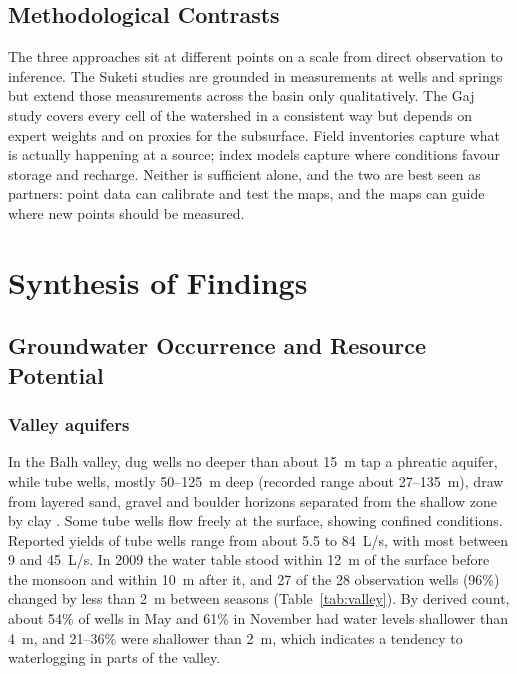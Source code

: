 \documentclass[10pt,a4paper,twocolumn]{article}
\newcommand{\lps}{L/s}
\begin{document}
\subsection{Methodological Contrasts}

The three approaches sit at different points on a scale from direct observation to inference.
The Suketi studies are grounded in measurements at wells and springs but extend those
measurements across the basin only qualitatively. The Gaj study covers every cell of the
watershed in a consistent way but depends on expert weights and on proxies for the subsurface.
Field inventories capture what is actually happening at a source; index models capture where
conditions favour storage and recharge. Neither is sufficient alone, and the two are best seen
as partners: point data can calibrate and test the maps, and the maps can guide where new
points should be measured.

\section{Synthesis of Findings}

\subsection{Groundwater Occurrence and Resource Potential}

\subsubsection{Valley aquifers}
In the Balh valley, dug wells no deeper than about 15~m tap a phreatic aquifer, while tube
wells, mostly 50--125~m deep (recorded range about 27--135~m), draw from layered sand, gravel and boulder horizons separated from
the shallow zone by clay \citep{pophare2015}. Some tube wells flow freely at the surface,
showing confined conditions. Reported yields of tube wells range from about 5.5 to 84~\lps{},
with most between 9 and 45~\lps{}. In 2009 the water table stood within 12~m of the surface
before the monsoon and within 10~m after it, and 27 of the 28 observation wells (96\%) changed by
less than 2~m between seasons (Table~\ref{tab:valley}). By derived count, about 54\% of wells in
May and 61\% in November had water levels shallower than 4~m, and 21--36\% were shallower than
2~m, which indicates a tendency to waterlogging in parts of the valley.
\end{document}
